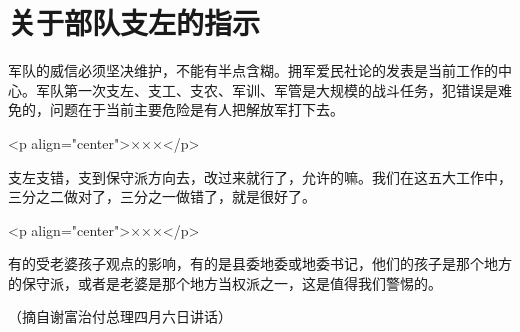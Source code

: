 \section[关于部队支左的指示（一九六七年四月）]{关于部队支左的指示}


军队的威信必须坚决维护，不能有半点含糊。拥军爱民社论的发表是当前工作的中心。军队第一次支左、支工、支农、军训、军管是大规模的战斗任务，犯错误是难免的，问题在于当前主要危险是有人把解放军打下去。

<p align="center">×××</p>

支左支错，支到保守派方向去，改过来就行了，允许的嘛。我们在这五大工作中，三分之二做对了，三分之一做错了，就是很好了。

<p align="center">×××</p>

有的受老婆孩子观点的影响，有的是县委地委或地委书记，他们的孩子是那个地方的保守派，或者是老婆是那个地方当权派之一，这是值得我们警惕的。

{\raggedleft （摘自谢富治付总理四月六日讲话）\par}


